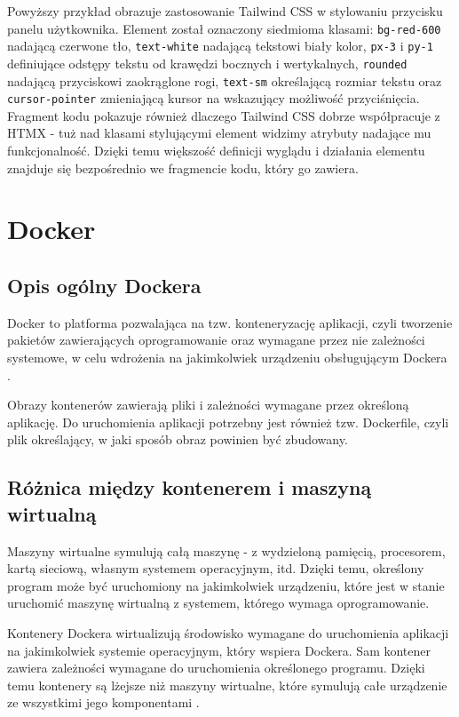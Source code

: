 Powyższy przykład obrazuje zastosowanie Tailwind CSS w stylowaniu przycisku panelu użytkownika. Element został oznaczony siedmioma klasami: \texttt{bg-red-600} nadającą czerwone tło, \texttt{text-white} nadającą tekstowi biały kolor, \texttt{px-3} i \texttt{py-1} definiujące odstępy tekstu od krawędzi bocznych i wertykalnych, \texttt{rounded} nadającą przyciskowi zaokrąglone rogi, \texttt{text-sm} określającą rozmiar tekstu oraz \texttt{cursor-pointer} zmieniającą kursor na wskazujący możliwość przyciśnięcia. Fragment kodu pokazuje również dlaczego Tailwind CSS dobrze współpracuje z HTMX - tuż nad klasami stylującymi element widzimy atrybuty nadające mu funkcjonalność. Dzięki temu większość definicji wyglądu i działania elementu znajduje się bezpośrednio we fragmencie kodu, który go zawiera.

\section{Docker}
\subsection{Opis ogólny Dockera}
Docker to platforma pozwalająca na tzw. konteneryzację aplikacji, czyli tworzenie pakietów zawierających oprogramowanie oraz wymagane przez nie zależności systemowe, w celu wdrożenia na jakimkolwiek urządzeniu obsługującym Dockera \parencite{docker_overview}. 

Obrazy kontenerów zawierają pliki i zależności wymagane przez określoną aplikację. Do uruchomienia aplikacji potrzebny jest również tzw. Dockerfile, czyli plik określający, w jaki sposób obraz powinien być zbudowany.

\subsection{Różnica między kontenerem i maszyną wirtualną}
Maszyny wirtualne symulują całą maszynę - z wydzieloną pamięcią, procesorem, kartą sieciową, własnym systemem operacyjnym, itd. Dzięki temu, określony program może być uruchomiony na jakimkolwiek urządzeniu, które jest w stanie uruchomić maszynę wirtualną z systemem, którego wymaga oprogramowanie. 

Kontenery Dockera wirtualizują środowisko wymagane do uruchomienia aplikacji na jakimkolwiek systemie operacyjnym, który wspiera Dockera. Sam kontener zawiera zależności wymagane do uruchomienia określonego programu. Dzięki temu kontenery są lżejsze niż maszyny wirtualne, które symulują całe urządzenie ze wszystkimi jego komponentami \parencite{docker_containers}.

